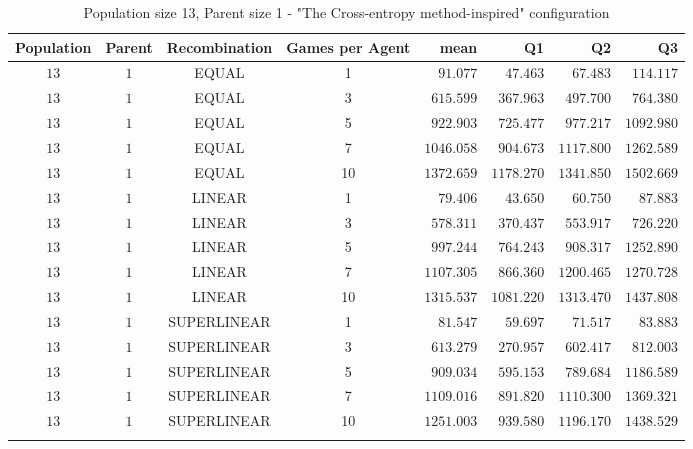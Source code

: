 \begin{table}[H]
\centering
\small
\begin{tabular}{c c c c r r r r}
Population & Parent & Recombination & Games per Agent & mean & Q1 & Q2 & Q3\\
\hline
$13$ & $1$ & EQUAL & 1 & $91.077$ & $47.463$ & $67.483$ & $114.117$\\
$13$ & $1$ & EQUAL & 3 & $615.599$ & $367.963$ & $497.700$ & $764.380$\\
$13$ & $1$ & EQUAL & 5 & $922.903$ & $725.477$ & $977.217$ & $1092.980$\\
$13$ & $1$ & EQUAL & 7 & $1046.058$ & $904.673$ & $1117.800$ & $1262.589$\\
\hdashline
$13$ & $1$ & EQUAL & 10 & $1372.659$ & $1178.270$ & $1341.850$ & $1502.669$\\
\hdashline
$13$ & $1$ & LINEAR & 1 & $79.406$ & $43.650$ & $60.750$ & $87.883$\\
$13$ & $1$ & LINEAR & 3 & $578.311$ & $370.437$ & $553.917$ & $726.220$\\
$13$ & $1$ & LINEAR & 5 & $997.244$ & $764.243$ & $908.317$ & $1252.890$\\
$13$ & $1$ & LINEAR & 7 & $1107.305$ & $866.360$ & $1200.465$ & $1270.728$\\
\hdashline
$13$ & $1$ & LINEAR & 10 & $1315.537$ & $1081.220$ & $1313.470$ & $1437.808$\\
\hdashline
$13$ & $1$ & SUPERLINEAR & 1 & $81.547$ & $59.697$ & $71.517$ & $83.883$\\
$13$ & $1$ & SUPERLINEAR & 3 & $613.279$ & $270.957$ & $602.417$ & $812.003$\\
$13$ & $1$ & SUPERLINEAR & 5 & $909.034$ & $595.153$ & $789.684$ & $1186.589$\\
$13$ & $1$ & SUPERLINEAR & 7 & $1109.016$ & $891.820$ & $1110.300$ & $1369.321$\\
\hdashline
$13$ & $1$ & SUPERLINEAR & 10 & $1251.003$ & $939.580$ & $1196.170$ & $1438.529$\\
\hdashline
\end{tabular}
\caption{Population size 13, Parent size 1 - "The Cross-entropy method-inspired" configuration}
\end{table}


